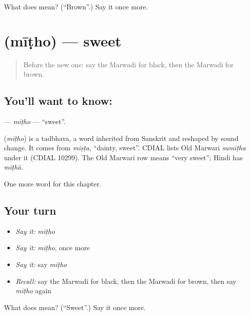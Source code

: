 \begin{tcolorbox}[breakable,colback=teal!4,colframe=teal!35!black,title={Before you move on}]
What does  mean? (\textquotedblleft{}Brown\textquotedblright{}.) Say it once more.
\end{tcolorbox}
\section[\texorpdfstring{\mw{मीठो} (mīṭho)}{मीठो (mīṭho)}]{ (mīṭho) — sweet}

\label{lesson:MW-C77-mitho}



\begin{quote}
Before the new one: say the Marwadi for black, then the Marwadi for brown.
\end{quote}

\subsection*{You'll want to know: }
\textbf{} — \emph{mīṭho} — \textquotedblleft{}sweet\textquotedblright{}.

\begin{cousinweb}
\textbf{} (\emph{mīṭho}) is a tadbhava, a word inherited from Sanskrit and reshaped by sound change. It comes from \emph{miṣṭa}, \textquotedblleft{}dainty, sweet\textquotedblright{}. CDIAL lists Old Marwari \emph{sumīṭha} under it (CDIAL 10299). The Old Marwari row means \textquotedblleft{}very sweet\textquotedblright{}; Hindi has \emph{mīṭhā}.
\end{cousinweb}

\begin{grammarlens}[title={What you've built}]
One more word for this chapter.
\end{grammarlens}

\subsection*{Your turn}
\begin{itemize}
\raggedright
  \item \emph{Say it:} \emph{mīṭho}
  \item \emph{Say it:} \emph{mīṭho}, once more
  \item \emph{Say it:} say \emph{mīṭho}
  \item \emph{Recall:} say the Marwadi for black, then the Marwadi for brown, then say \emph{mīṭho} again
\end{itemize}

\begin{tcolorbox}[breakable,colback=teal!4,colframe=teal!35!black,title={Before you move on}]
What does  mean? (\textquotedblleft{}Sweet\textquotedblright{}.) Say it once more.
\end{tcolorbox}
